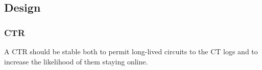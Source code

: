 %
%
%
%
%
%
%
%

\subsection{Design}

\subsubsection{CTR}
A CTR should be stable both to permit long-lived circuits to the CT logs and
to increase the likelihood of them staying online.

